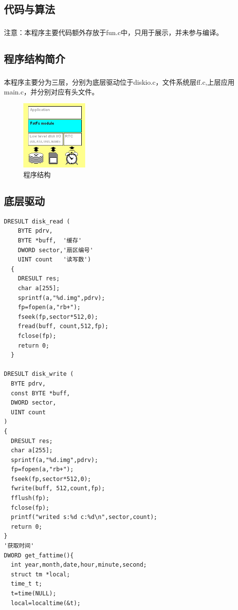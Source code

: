 \documentclass{report}
\begin{document}
\begin{CJK}{GBK}{hei}
\chapter{代码与算法}
\paragraph{} 注意：本程序主要代码额外存放于fun.c中，只用于展示，并未参与编译。
\section{程序结构简介}
\paragraph{} 本程序主要分为三层，分别为底层驱动位于diskio.c，文件系统层ff.c,上层应用main.c，并分别对应有头文件。
  \begin{figure}
  \centering
  \includegraphics[width=0.3\textwidth]{layers.jpg}
  \caption{程序结构}
  \label{}
  \end{figure}

\section{底层驱动}
\pagebreak
\begin{lstlisting}[language={[ANSI]C}]
  DRESULT disk_read (
    BYTE pdrv,
    BYTE *buff,  '缓存'
    DWORD sector,'扇区编号'
    UINT count   '读写数')
  {
    DRESULT res;
    char a[255];
    sprintf(a,"%d.img",pdrv);
    fp=fopen(a,"rb+");
    fseek(fp,sector*512,0);
    fread(buff, count,512,fp);
    fclose(fp);
    return 0;
  }

DRESULT disk_write (
  BYTE pdrv,
  const BYTE *buff,
  DWORD sector,
  UINT count
)
{
  DRESULT res;
  char a[255];
  sprintf(a,"%d.img",pdrv);
  fp=fopen(a,"rb+");
  fseek(fp,sector*512,0);
  fwrite(buff, 512,count,fp);
  fflush(fp);
  fclose(fp);
  printf("writed s:%d c:%d\n",sector,count);
  return 0;
}
'获取时间'
DWORD get_fattime(){
  int year,month,date,hour,minute,second;
  struct tm *local;
  time_t t;
  t=time(NULL);
  local=localtime(&t);


\end{lstlisting}
\end{CJK}
\end{document}
